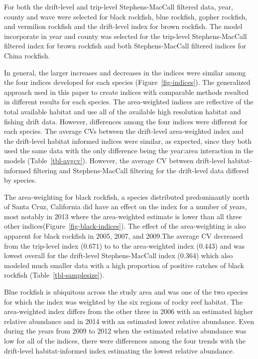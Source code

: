 \documentclass[
  12pt,
  authoryear,
  preprint,
  3p]{elsarticle}
\begin{document}
For both the drift-level and trip-level Stephens-MacCall filtered data,
year, county and wave were selected for black rockfish, blue rockfish,
gopher rockfish, and vermilion rockfish and the drift-level index for
brown rockfish. The model incorporate in year and county was selected
for the trip-level Stephens-MacCall filtered index for brown rockfish
and both Stephens-MacCall filtered indices for China rockfish.

In general, the larger increases and decreases in the indices were
similar among the four indices developed for each species
(Figure~\ref{fig-indices}). The generalized approach used in this paper
to create indices with comparable methods resulted in different results
for each species. The area-weighted indices are reflective of the total
available habitat and use all of the available high resolution habitat
and fishing drift data. However, differences among the four indices were
different for each species. The average CVs between the drift-level
area-weighted index and the drift-level habitat informed indices were
similar, as expected, since they both used the same data with the only
difference being the year:area interaction in the models
(Table~\ref{tbl-avgcv}). However, the average CV between drift-level
habitat-informed filtering and Stephens-MacCall filtering for the
drift-level data differed by species.

The area-weighting for black rockfish, a species distributed
predominantly north of Santa Cruz, California did have an effect on the
index for a number of years, most notably in 2013 where the
area-weighted estimate is lower than all three other
indices(Figure~\ref{fig-black-indices}). The effect of the
area-weighting is also apparent for black rockfish in 2005, 2007, and
2009.The average CV decreased from the trip-level index (0.671) to to
the area-weighted index (0.443) and was lowest overall for the
drift-level Stephens-MacCall index (0.364) which also modeled much
smaller data with a high proportion of positive catches of black
rockfish (Table~\ref{tbl-samplesize}).

Blue rockfish is ubiquitous across the study area and was one of the two
species for which the index was weighted by the six regions of rocky
reef habitat. The area-weighted index differs from the other three in
2006 with an estimated higher relative abundance and in 2014 with an
estimated lower relative abundance. Even during the years from 2009 to
2012 when the estimated relative abundance was low for all of the
indices, there were differences among the four trends with the
drift-level habitat-informed index estimating the lowest relative
abundance.
\end{document}
